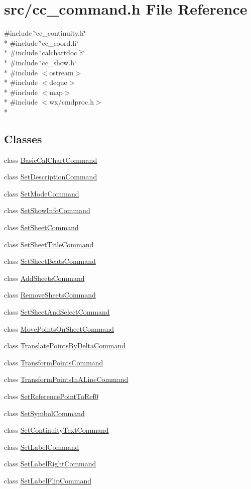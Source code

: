\hypertarget{a00183}{\section{src/cc\-\_\-command.h File Reference}
\label{a00183}
}
{\ttfamily \#include \char`\"{}cc\-\_\-continuity.\-h\char`\"{}}\\*
{\ttfamily \#include \char`\"{}cc\-\_\-coord.\-h\char`\"{}}\\*
{\ttfamily \#include \char`\"{}calchartdoc.\-h\char`\"{}}\\*
{\ttfamily \#include \char`\"{}cc\-\_\-show.\-h\char`\"{}}\\*
{\ttfamily \#include $<$ostream$>$}\\*
{\ttfamily \#include $<$deque$>$}\\*
{\ttfamily \#include $<$map$>$}\\*
{\ttfamily \#include $<$wx/cmdproc.\-h$>$}\\*
\subsection*{Classes}
\begin{DoxyCompactItemize}
\item 
class \hyperlink{a00018}{Basic\-Cal\-Chart\-Command}
\item 
class \hyperlink{a00125}{Set\-Description\-Command}
\item 
class \hyperlink{a00130}{Set\-Mode\-Command}
\item 
class \hyperlink{a00136}{Set\-Show\-Info\-Command}
\item 
class \hyperlink{a00134}{Set\-Sheet\-Command}
\item 
class \hyperlink{a00135}{Set\-Sheet\-Title\-Command}
\item 
class \hyperlink{a00133}{Set\-Sheet\-Beats\-Command}
\item 
class \hyperlink{a00001}{Add\-Sheets\-Command}
\item 
class \hyperlink{a00122}{Remove\-Sheets\-Command}
\item 
class \hyperlink{a00132}{Set\-Sheet\-And\-Select\-Command}
\item 
class \hyperlink{a00112}{Move\-Points\-On\-Sheet\-Command}
\item 
class \hyperlink{a00150}{Translate\-Points\-By\-Delta\-Command}
\item 
class \hyperlink{a00148}{Transform\-Points\-Command}
\item 
class \hyperlink{a00149}{Transform\-Points\-In\-A\-Line\-Command}
\item 
class \hyperlink{a00131}{Set\-Reference\-Point\-To\-Ref0}
\item 
class \hyperlink{a00137}{Set\-Symbol\-Command}
\item 
class \hyperlink{a00124}{Set\-Continuity\-Text\-Command}
\item 
class \hyperlink{a00127}{Set\-Label\-Command}
\item 
class \hyperlink{a00129}{Set\-Label\-Right\-Command}
\item 
class \hyperlink{a00128}{Set\-Label\-Flip\-Command}
\end{DoxyCompactItemize}
